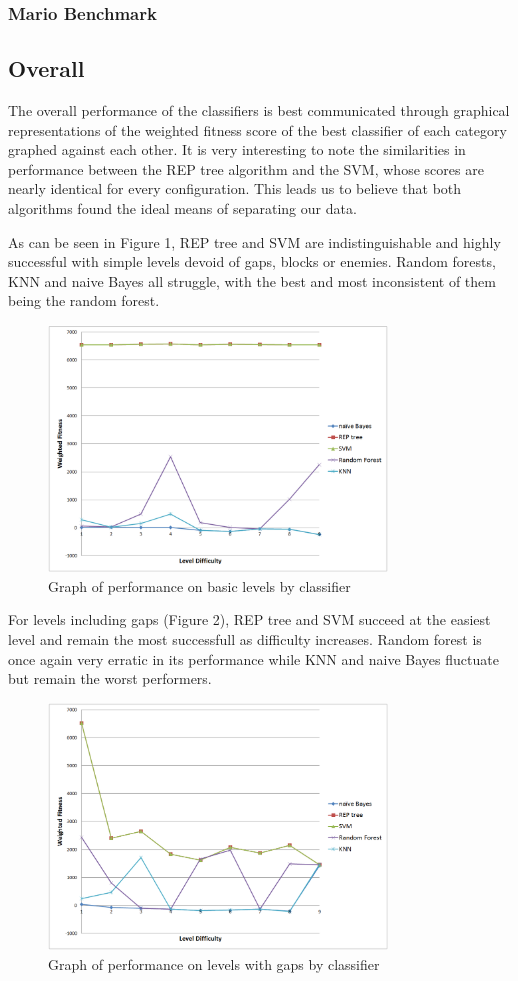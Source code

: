 \documentclass[]{article}   %
\begin{document}
\subsubsection{Mario Benchmark}

\subsection{Overall}

The overall performance of the classifiers is best communicated through graphical representations of the weighted fitness score of the best classifier
of each category graphed against each other. It is very interesting to note the similarities in performance between the REP tree algorithm and the SVM,
whose scores are nearly identical for every configuration. This leads us to believe that both algorithms found the ideal means of separating our data.


As can be seen in Figure 1, REP tree and SVM are indistinguishable and highly successful with simple levels devoid of gaps, blocks or enemies. Random
forests, KNN and naive Bayes all struggle, with the best and most inconsistent of them being the random forest.
\begin{figure}[H]
\centering
\includegraphics[width=90mm]{basic.png}
\caption{Graph of performance on basic levels by classifier}
\end{figure}

For levels including gaps (Figure 2), REP tree and SVM succeed at the easiest level and remain the most successfull as difficulty increases. Random forest is once again
very erratic in its performance while KNN and naive Bayes fluctuate but remain the worst performers.
\begin{figure}[H]
\centering
\includegraphics[width=90mm]{gaps.png}
\caption{Graph of performance on levels with gaps by classifier}
\end{figure}
\end{document}
